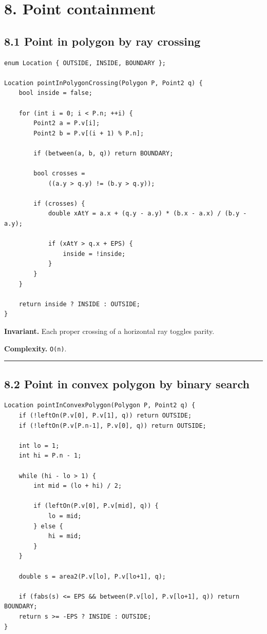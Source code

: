 \documentclass[11pt]{article}
\begin{document}
\section{8. Point containment}\label{point-containment}

\subsection{8.1 Point in polygon by ray
crossing}\label{point-in-polygon-by-ray-crossing}

\begin{verbatim}
enum Location { OUTSIDE, INSIDE, BOUNDARY };

Location pointInPolygonCrossing(Polygon P, Point2 q) {
    bool inside = false;

    for (int i = 0; i < P.n; ++i) {
        Point2 a = P.v[i];
        Point2 b = P.v[(i + 1) % P.n];

        if (between(a, b, q)) return BOUNDARY;

        bool crosses =
            ((a.y > q.y) != (b.y > q.y));

        if (crosses) {
            double xAtY = a.x + (q.y - a.y) * (b.x - a.x) / (b.y - a.y);

            if (xAtY > q.x + EPS) {
                inside = !inside;
            }
        }
    }

    return inside ? INSIDE : OUTSIDE;
}
\end{verbatim}

\textbf{Invariant.} Each proper crossing of a horizontal ray toggles
parity.

\textbf{Complexity.} \texttt{O(n)}.

\begin{center}\rule{0.5\linewidth}{0.5pt}\end{center}

\subsection{8.2 Point in convex polygon by binary
search}\label{point-in-convex-polygon-by-binary-search}

\begin{verbatim}
Location pointInConvexPolygon(Polygon P, Point2 q) {
    if (!leftOn(P.v[0], P.v[1], q)) return OUTSIDE;
    if (!leftOn(P.v[P.n-1], P.v[0], q)) return OUTSIDE;

    int lo = 1;
    int hi = P.n - 1;

    while (hi - lo > 1) {
        int mid = (lo + hi) / 2;

        if (leftOn(P.v[0], P.v[mid], q)) {
            lo = mid;
        } else {
            hi = mid;
        }
    }

    double s = area2(P.v[lo], P.v[lo+1], q);

    if (fabs(s) <= EPS && between(P.v[lo], P.v[lo+1], q)) return BOUNDARY;
    return s >= -EPS ? INSIDE : OUTSIDE;
}
\end{verbatim}
\end{document}
